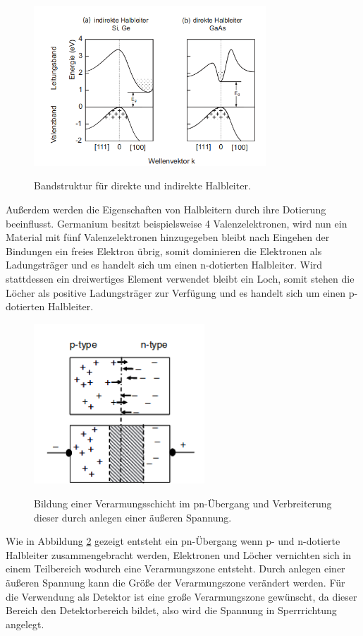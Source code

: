 \begin{figure}
  \centering
  \includegraphics[height=6cm]{Band.png}
  \caption{Bandstruktur für direkte und indirekte Halbleiter.}
  \label{fig:Band}
  \cite{Springer3}
\end{figure}

Außerdem werden die Eigenschaften von Halbleitern durch ihre Dotierung beeinflusst. Germanium besitzt
beispielsweise 4 Valenzelektronen, wird nun ein Material mit fünf Valenzelektronen hinzugegeben bleibt nach
Eingehen der Bindungen ein freies Elektron übrig, somit dominieren die Elektronen als Ladungsträger und es handelt
sich um einen n-dotierten Halbleiter.
Wird stattdessen ein dreiwertiges Element verwendet bleibt ein Loch, somit stehen die Löcher als
positive Ladungsträger zur Verfügung und es handelt sich um einen p-dotierten Halbleiter.\\

\begin{figure}[H]
  \centering
  \includegraphics[height=6cm]{pn.png}
  \caption{Bildung einer Verarmungsschicht im pn-Übergang und Verbreiterung dieser durch
  anlegen einer äußeren Spannung.}
  \label{fig:pn}
  \cite{Gilmore2}
\end{figure}

Wie in Abbildung \ref{fig:pn} gezeigt entsteht ein pn-Übergang wenn p- und n-dotierte Halbleiter zusammengebracht werden,
Elektronen und Löcher vernichten sich in einem Teilbereich wodurch eine Verarmungszone entsteht.
Durch anlegen einer äußeren Spannung kann die Größe der Verarmungszone verändert werden. Für die
Verwendung als Detektor ist eine große Verarmungszone gewünscht, da dieser Bereich den
Detektorbereich bildet, also wird die Spannung in Sperrrichtung angelegt.


